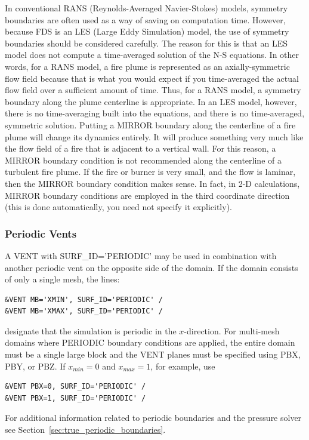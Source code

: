 \documentclass[11pt]{book}
\begin{document}
In conventional RANS (Reynolds-Averaged Navier-Stokes) models, symmetry boundaries are often used as a way of saving on computation time. However, because FDS is an LES (Large Eddy Simulation) model, the use of symmetry boundaries should be considered carefully. The reason for this is that an LES model does not compute a time-averaged solution of the N-S equations. In other words, for a RANS model, a fire plume is represented as an axially-symmetric flow field because that is what you would expect if you time-averaged the actual flow field over a sufficient amount of time. Thus, for a RANS model, a symmetry boundary along the plume centerline is appropriate. In an LES model, however, there is no time-averaging built into the equations, and there is no time-averaged, symmetric solution. Putting a {\ct MIRROR} boundary along the centerline of a fire plume will change its dynamics entirely. It will produce something very much like the flow field of a fire that is adjacent to a vertical wall. For this reason, a {\ct MIRROR} boundary condition is not recommended along the centerline of a turbulent fire plume. If the fire or burner is very small, and the flow is laminar, then the {\ct MIRROR} boundary condition makes sense. In fact, in 2-D calculations, {\ct MIRROR} boundary conditions are employed in the third coordinate direction (this is done automatically, you need not specify it explicitly).

\subsubsection{Periodic Vents}
\label{sec:periodic}

A {\ct VENT} with {\ct SURF\_ID='PERIODIC'} may be used in combination with another periodic vent on the opposite side of the domain.  If the domain consists of only a single mesh, the lines:
\begin{lstlisting}
&VENT MB='XMIN', SURF_ID='PERIODIC' /
&VENT MB='XMAX', SURF_ID='PERIODIC' /
\end{lstlisting}
designate that the simulation is periodic in the $x$-direction. For multi-mesh domains where {\ct PERIODIC} boundary conditions are applied, the entire domain must be a single large block and the {\ct VENT} planes must be specified using {\ct PBX}, {\ct PBY}, or {\ct PBZ}.  If $x_{\si{min}}=0$ and $x_{\si{max}}=1$, for example, use
\begin{lstlisting}
&VENT PBX=0, SURF_ID='PERIODIC' /
&VENT PBX=1, SURF_ID='PERIODIC' /
\end{lstlisting}
For additional information related to periodic boundaries and the pressure solver see Section~\ref{sec:true_periodic_boundaries}.
\end{document}
